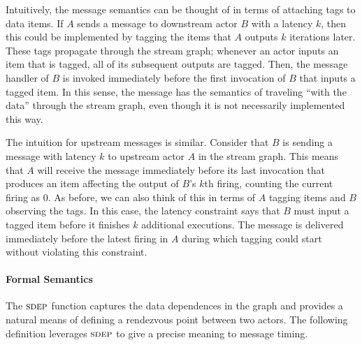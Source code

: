 Intuitively, the message semantics can be thought of in terms of
attaching tags to data items.  If $A$ sends a message to downstream
actor $B$ with a latency $k$, then this could be implemented by
tagging the items that $A$ outputs $k$ iterations later.  These tags
propagate through the stream graph; whenever an actor inputs an item
that is tagged, all of its subsequent outputs are tagged.  Then, the
message handler of $B$ is invoked immediately before the first
invocation of $B$ that inputs a tagged item.  In this sense, the
message has the semantics of traveling ``with the data'' through the
stream graph, even though it is not necessarily implemented this way.

The intuition for upstream messages is similar.  Consider that $B$ is
sending a message with latency $k$ to upstream actor $A$ in the stream
graph.  This means that $A$ will receive the message immediately
before its last invocation that produces an item affecting the output
of $B$'s $k$th firing, counting the current firing as 0.  As before,
we can also think of this in terms of $A$ tagging items and $B$
observing the tags.  In this case, the latency constraint says that
$B$ must input a tagged item before it finishes $k$ additional
executions.  The message is delivered immediately before the latest
firing in $A$ during which tagging could start without violating this
constraint.

\paragraph*{Formal Semantics} The $\textsc{sdep}$ function captures the
data dependences in the graph and provides a natural means of defining
a rendezvous point between two actors.  The following definition
leverages $\textsc{sdep}$ to give a precise meaning to message timing.

